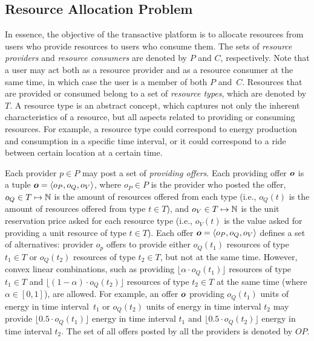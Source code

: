 \subsection{Resource Allocation Problem}
\label{sec:ResAllPro}

In essence, the objective of the transactive platform is to allocate resources from users who provide resources to users who consume them.
The sets of \emph{resource providers} and \emph{resource consumers} are denoted by $P$ and $C$, respectively.
Note that a user may act both as a resource provider and as a resource consumer at the same time, in which case the user is a member of both $P$ and~$C$. 
Resources that are provided or consumed belong to a set of \emph{resource types}, which are denoted by $T$.
A resource type is an abstract concept, which captures not only the inherent characteristics of a resource, but all aspects related to providing or consuming resources.
For example, a resource type could correspond to energy production and consumption in a specific time interval, or it could correspond to a ride between certain location at a certain time.

Each provider $p \in P$ may post a set of \emph{providing offers}. %
Each providing offer $\boldsymbol{o}$ %
is a tuple $\boldsymbol{o} = \langle o_P, o_Q, o_V \rangle$, where $o_P \in P$ is the provider who posted the offer, $o_Q \in T \mapsto \mathbb{N}$ is the amount of resources offered from each type (i.e., $o_Q(t)$ is the amount of resources offered from type $t \in T$), and $o_V \in T \mapsto \mathbb{N}$ is the unit reservation price asked for each resource type (i.e., $o_V(t)$ is the value asked for providing a unit resource of type $t \in T$).
Each offer $\boldsymbol{o} = \langle o_P, o_Q, o_V \rangle$ defines a set of alternatives: provider $o_p$ offers to provide either $o_Q(t_1)$ resources of type $t_1 \in T$ or $o_Q(t_2)$ resources of type $t_2 \in T$, but not at the same time.
However, convex linear combinations, such as providing $\lfloor \alpha \cdot o_Q(t_1)  \rfloor$ resources of type $t_1 \in T$ and $\lfloor (1 - \alpha) \cdot o_Q(t_2) \rfloor$ resources of type $t_2 \in T$ at the same time (where $\alpha \in [0, 1]$), are allowed.
For example, an offer $\boldsymbol{o}$ providing $o_Q(t_1)$ units of energy in time interval~$t_1$ or $o_Q(t_2)$ units of energy in time interval $t_2$ may provide $\lfloor 0.5 \cdot o_Q(t_1) \rfloor$ energy in time interval $t_1$ and $\lfloor 0.5 \cdot o_Q(t_2) \rfloor$ energy in time interval $t_2$.
The set of all offers posted by all the providers is denoted by $O\!P$. %

